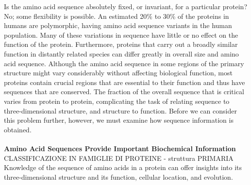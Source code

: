 Is the amino acid sequence absolutely fixed, or invariant, for a particular protein? No; some flexibility is possible. An estimated 20\% to 30\% of the proteins in humans are polymorphic, having amino acid sequence variants in the human population. Many of these variations in sequence have little or no effect on the function of the protein. Furthermore, proteins that carry out a broadly similar function in distantly related species can differ greatly in overall size and amino acid sequence. Although the amino acid sequence in some regions of the primary structure might vary considerably without affecting biological function, most proteins contain crucial regions that are essential to their function and thus have sequences that are conserved. The fraction of the overall sequence that is critical varies from protein to protein, complicating the task of relating sequence to three-dimensional structure, and structure to function. Before we can consider this problem further, however, we must examine how sequence information is obtained. \\
\\
\textbf{Amino Acid Sequences Provide Important Biochemical Information} CLASSIFICAZIONE  IN FAMIGLIE DI PROTEINE - struttura PRIMARIA\\
Knowledge of the sequence of amino acids in a protein can offer insights into its three-dimensional structure and its function, cellular location, and evolution. 
